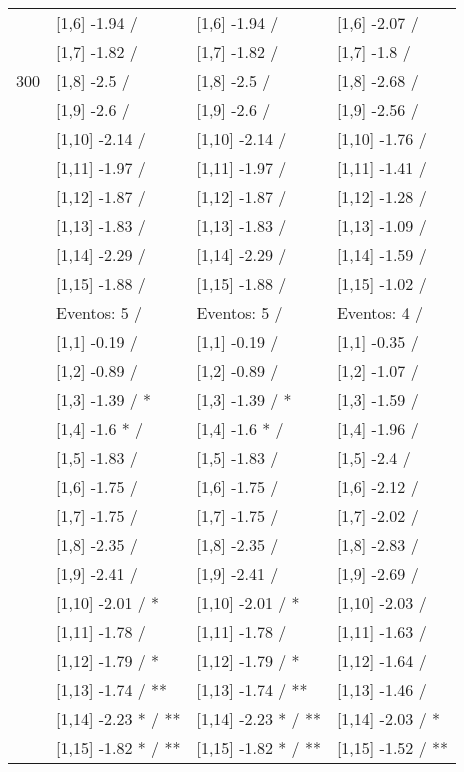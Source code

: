 \begin{table}
\begin{tabular}[t]{llll}
 & {}[1,6] -1.94  / & {}[1,6] -1.94  / & {}[1,6] -2.07  /\\
 & {}[1,7] -1.82  / & {}[1,7] -1.82  / & {}[1,7] -1.8  /\\
300 & {}[1,8] -2.5  / & {}[1,8] -2.5  / & {}[1,8] -2.68  /\\
\addlinespace
 & {}[1,9] -2.6  / & {}[1,9] -2.6  / & {}[1,9] -2.56  /\\
 & {}[1,10] -2.14  / & {}[1,10] -2.14  / & {}[1,10] -1.76  /\\
 & {}[1,11] -1.97  / & {}[1,11] -1.97  / & {}[1,11] -1.41  /\\
 & {}[1,12] -1.87  / & {}[1,12] -1.87  / & {}[1,12] -1.28  /\\
 & {}[1,13] -1.83  / & {}[1,13] -1.83  / & {}[1,13] -1.09  /\\
\addlinespace
 & {}[1,14] -2.29  / & {}[1,14] -2.29  / & {}[1,14] -1.59  /\\
 & {}[1,15] -1.88  / & {}[1,15] -1.88  / & {}[1,15] -1.02  /\\
 & Eventos:  5 / & Eventos:  5 / & Eventos:  4 /\\
 & {}[1,1] -0.19  / & {}[1,1] -0.19  / & {}[1,1] -0.35  /\\
 & {}[1,2] -0.89  / & {}[1,2] -0.89  / & {}[1,2] -1.07  /\\
\addlinespace
 & {}[1,3] -1.39  / * & {}[1,3] -1.39  / * & {}[1,3] -1.59  /\\
 & {}[1,4] -1.6 * / & {}[1,4] -1.6 * / & {}[1,4] -1.96  /\\
 & {}[1,5] -1.83  / & {}[1,5] -1.83  / & {}[1,5] -2.4  /\\
 & {}[1,6] -1.75  / & {}[1,6] -1.75  / & {}[1,6] -2.12  /\\
 & {}[1,7] -1.75  / & {}[1,7] -1.75  / & {}[1,7] -2.02  /\\
\addlinespace
500 & {}[1,8] -2.35  / & {}[1,8] -2.35  / & {}[1,8] -2.83  /\\
 & {}[1,9] -2.41  / & {}[1,9] -2.41  / & {}[1,9] -2.69  /\\
 & {}[1,10] -2.01  / * & {}[1,10] -2.01  / * & {}[1,10] -2.03  /\\
 & {}[1,11] -1.78  / & {}[1,11] -1.78  / & {}[1,11] -1.63  /\\
 & {}[1,12] -1.79  / * & {}[1,12] -1.79  / * & {}[1,12] -1.64  /\\
\addlinespace
 & {}[1,13] -1.74  / ** & {}[1,13] -1.74  / ** & {}[1,13] -1.46  /\\
 & {}[1,14] -2.23 * / ** & {}[1,14] -2.23 * / ** & {}[1,14] -2.03  / *\\
 & {}[1,15] -1.82 * / ** & {}[1,15] -1.82 * / ** & {}[1,15] -1.52  / **\\
\bottomrule
\end{tabular}
\end{table}
